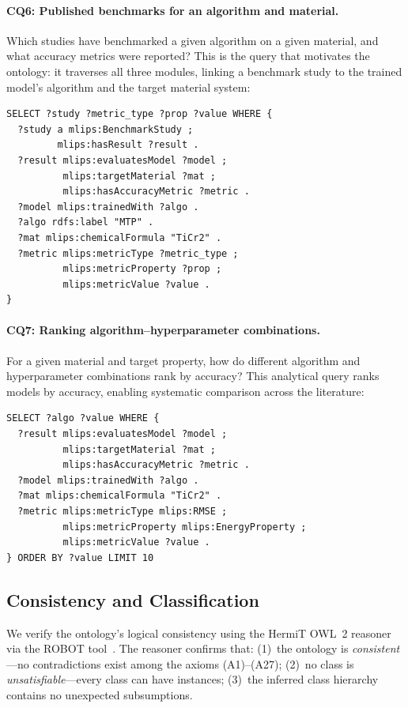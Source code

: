 \paragraph{CQ6: Published benchmarks for an algorithm and material.}
Which studies have benchmarked a given algorithm on a given material, and
what accuracy metrics were reported? This is the query that motivates the
ontology: it traverses all three modules, linking a benchmark study to the
trained model's algorithm and the target material system:
%
\begin{lstlisting}[language=sparql]
SELECT ?study ?metric_type ?prop ?value WHERE {
  ?study a mlips:BenchmarkStudy ;
         mlips:hasResult ?result .
  ?result mlips:evaluatesModel ?model ;
          mlips:targetMaterial ?mat ;
          mlips:hasAccuracyMetric ?metric .
  ?model mlips:trainedWith ?algo .
  ?algo rdfs:label "MTP" .
  ?mat mlips:chemicalFormula "TiCr2" .
  ?metric mlips:metricType ?metric_type ;
          mlips:metricProperty ?prop ;
          mlips:metricValue ?value .
}
\end{lstlisting}

\paragraph{CQ7: Ranking algorithm--hyperparameter combinations.}
For a given material and target property, how do different
algorithm and hyperparameter combinations rank by accuracy? This
analytical query ranks models by accuracy, enabling systematic
comparison across the literature:
%
\begin{lstlisting}[language=sparql]
SELECT ?algo ?value WHERE {
  ?result mlips:evaluatesModel ?model ;
          mlips:targetMaterial ?mat ;
          mlips:hasAccuracyMetric ?metric .
  ?model mlips:trainedWith ?algo .
  ?mat mlips:chemicalFormula "TiCr2" .
  ?metric mlips:metricType mlips:RMSE ;
          mlips:metricProperty mlips:EnergyProperty ;
          mlips:metricValue ?value .
} ORDER BY ?value LIMIT 10
\end{lstlisting}

\subsection{Consistency and Classification}
\label{sec:eval-consistency}

We verify the ontology's logical consistency using the HermiT OWL~2
reasoner~\cite{glimm2014hermit} via the ROBOT
tool~\cite{jackson2019robot}. The reasoner confirms that:
(1)~the ontology is \emph{consistent}---no contradictions exist among the
axioms (A1)--(A27);
(2)~no class is \emph{unsatisfiable}---every class can have instances;
(3)~the inferred class hierarchy contains no unexpected subsumptions.

